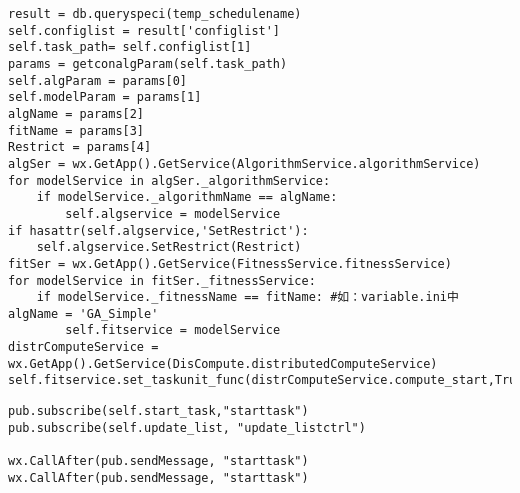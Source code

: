 

\begin{lstlisting}
result = db.queryspeci(temp_schedulename)
self.configlist = result['configlist']
self.task_path= self.configlist[1]
params = getconalgParam(self.task_path)
self.algParam = params[0] 
self.modelParam = params[1]
algName = params[2]
fitName = params[3]
Restrict = params[4]
algSer = wx.GetApp().GetService(AlgorithmService.algorithmService)
for modelService in algSer._algorithmService:
    if modelService._algorithmName == algName: 
        self.algservice = modelService
if hasattr(self.algservice,'SetRestrict'):
    self.algservice.SetRestrict(Restrict)
fitSer = wx.GetApp().GetService(FitnessService.fitnessService)
for modelService in fitSer._fitnessService:
    if modelService._fitnessName == fitName: #如：variable.ini中 algName = 'GA_Simple'    
        self.fitservice = modelService
distrComputeService = wx.GetApp().GetService(DisCompute.distributedComputeService)
self.fitservice.set_taskunit_func(distrComputeService.compute_start,True)
\end{lstlisting}




\begin{lstlisting}
pub.subscribe(self.start_task,"starttask")
pub.subscribe(self.update_list, "update_listctrl")

wx.CallAfter(pub.sendMessage, "starttask")
wx.CallAfter(pub.sendMessage, "starttask")    
\end{lstlisting}
